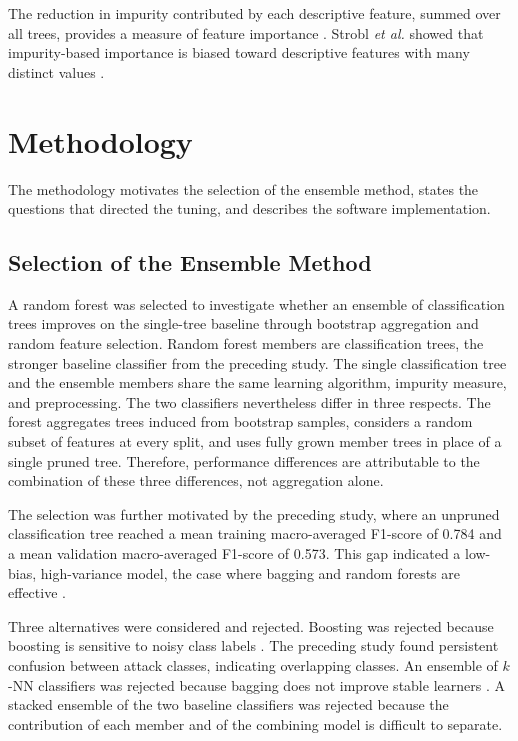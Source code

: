 \documentclass[conference]{IEEEtran}
\begin{document}
The reduction in impurity contributed by each descriptive feature, summed over all trees, provides a measure of feature importance \cite{strobl}. Strobl \textit{et al.} showed that impurity-based importance is biased toward descriptive features with many distinct values \cite{strobl}.

\section{Methodology}\label{sec:method}

The methodology motivates the selection of the ensemble method, states the questions that directed the tuning, and describes the software implementation.

\subsection{Selection of the Ensemble Method}
A random forest was selected to investigate whether an ensemble of classification trees improves on the single-tree baseline through bootstrap aggregation and random feature selection. Random forest members are classification trees, the stronger baseline classifier from the preceding study. The single classification tree and the ensemble members share the same learning algorithm, impurity measure, and preprocessing. The two classifiers nevertheless differ in three respects. The forest aggregates trees induced from bootstrap samples, considers a random subset of features at every split, and uses fully grown member trees in place of a single pruned tree. Therefore, performance differences are attributable to the combination of these three differences, not aggregation alone.

The selection was further motivated by the preceding study, where an unpruned classification tree reached a mean training macro-averaged F1-score of 0.784 and a mean validation macro-averaged F1-score of 0.573. This gap indicated a low-bias, high-variance model, the case where bagging and random forests are effective \cite{breiman1996,breiman2001}.

Three alternatives were considered and rejected. Boosting was rejected because boosting is sensitive to noisy class labels \cite{dietterich2000}. The preceding study found persistent confusion between attack classes, indicating overlapping classes. An ensemble of $k$-NN classifiers was rejected because bagging does not improve stable learners \cite{breiman1996}. A stacked ensemble of the two baseline classifiers was rejected because the contribution of each member and of the combining model is difficult to separate.
\end{document}
